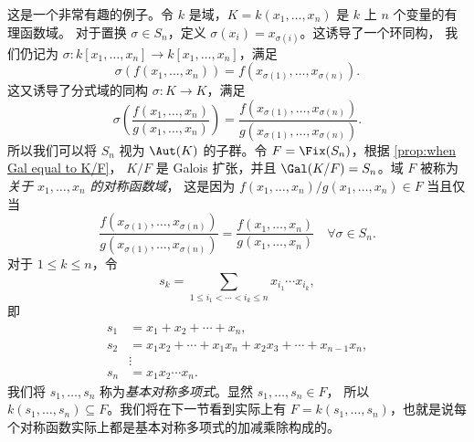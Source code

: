 \begin{example}\label{exa:symmetric function}
  这是一个非常有趣的例子。令 $k$ 是域，$K=k(x_1,\dots,x_n)$ 是 $k$ 上 $n$ 个变量的有理函数域。
  对于置换 $\sigma\in S_n$，定义 $\sigma(x_i)=x_{\sigma(i)}$。这诱导了一个环同构，
  我们仍记为 $\sigma:k[x_1,\dots,x_n]\to k[x_1,\dots,x_n]$，满足
  \[
    \sigma(f(x_1,\dots,x_n))  =f(x_{\sigma(1)},\dots,x_{\sigma(n)}).
  \]
  这又诱导了分式域的同构 $\sigma:K\to K$，满足
  \[
    \sigma\left(\frac{f(x_1,\dots,x_n)}{g(x_1,\dots,x_n)}\right) =
    \frac{f(x_{\sigma(1)},\dots,x_{\sigma(n)})}{g(x_{\sigma(1)},\dots,x_{\sigma(n)})}.
  \]
  所以我们可以将 $S_n$ 视为 $\Aut(K)$ 的子群。令 $F=\Fix(S_n)$，根据 \autoref{prop:when Gal equal to K/F}，
  $K/F$ 是 Galois 扩张，并且 $\Gal(K/F)=S_n$。域 $F$ 被称为\emph{关于 $x_1,\dots,x_n$ 的对称函数域}，
  这是因为 $f(x_1,\dots,x_n)/g(x_1,\dots,x_n)\in F$ 当且仅当
  \[
    \frac{f(x_{\sigma(1)},\dots,x_{\sigma(n)})}{g(x_{\sigma(1)},\dots,x_{\sigma(n)})}=
    \frac{f(x_1,\dots,x_n)}{g(x_1,\dots,x_n)}\quad \forall\sigma\in S_n.
  \]
  对于 $1\leq k\leq n$，令
  \[
    s_k=\sum_{1\leq i_1<\cdots<i_k\leq n} x_{i_1}\cdots x_{i_k}, 
  \]
  即
  \begin{align*}
    s_1&=x_1+x_2+\cdots+x_n,\\
    s_2&=x_1x_2+\cdots+x_1x_n+x_2x_3+\cdots+x_{n-1}x_n,\\
    &\vdots\\
    s_n&= x_1x_2\cdots x_n.
  \end{align*}
  我们将 $s_1,\dots,s_n$ 称为\emph{基本对称多项式}。显然 $s_1,\dots,s_n\in F$，
  所以 $k(s_1,\dots,s_n)\subseteq F$。我们将在下一节看到实际上有
  $F=k(s_1,\dots,s_n)$，也就是说每个对称函数实际上都是基本对称多项式的加减乘除构成的。
\end{example}
